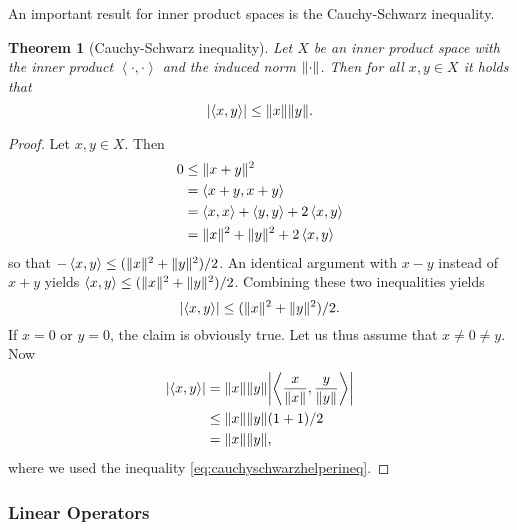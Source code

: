 \documentclass[english, 12pt, a4paper, sci, utf8, a-2b, online]{aaltothesis}
\theoremstyle{definition}
\theoremstyle{plain}
\newtheorem{theorem}{Theorem}[section]
\DeclarePairedDelimiter\abs{\lvert}{\rvert}
\DeclarePairedDelimiter\norm{\lVert}{\rVert}
\newcommand*{\innerprod}[2]{\left\langle #1, #2 \right\rangle}
\numberwithin{equation}{section}
\begin{document}
An important result for inner product spaces is the Cauchy-Schwarz inequality.
\begin{theorem}[Cauchy-Schwarz inequality]
    \label{thm:cauchyschwarz}
    Let $X$ be an inner product space with the inner product
    $\innerprod{\cdot}{\cdot}$ and the induced norm $\norm{\cdot}$.
    Then for all $x,y \in X$ it holds that
    \begin{equation*}
        \abs{\innerprod{x}{y}} \leq \norm{x} \norm{y}.
    \end{equation*}
\end{theorem}
\begin{proof}
    Let $x,y \in X$. Then
    \begin{align*}
        0 
        &\leq \norm{x + y}^2 \\
        &= \innerprod{x + y}{x + y} \\
        &= \innerprod{x}{x} + \innerprod{y}{y} + 2\innerprod{x}{y} \\
        &= \norm{x}^2 + \norm{y}^2 + 2\innerprod{x}{y}
    \end{align*}
    so that $-\innerprod{x}{y} \leq (\norm{x}^2 + \norm{y}^2)/2$.
    An identical argument with $x-y$ instead of $x+y$ yields
    $\innerprod{x}{y} \leq (\norm{x}^2 + \norm{y}^2)/2$.
    Combining these two inequalities yields
    \begin{equation}
        \label{eq:cauchyschwarzhelperineq}
        \abs{\innerprod{x}{y}} \leq (\norm{x}^2 + \norm{y}^2)/2.
    \end{equation}
    If $x=0$ or $y=0$, the claim is obviously true.
    Let us thus assume that $x \neq 0 \neq y$. Now
    \begin{align*}
        \abs{\innerprod{x}{y}}
        &= \norm{x} \norm{y} 
           \abs*{\innerprod{\frac{x}{\norm{x}}}{\frac{y}{\norm{y}}}} \\
        &\leq \norm{x} \norm{y} (1+1)/2 \\
        &= \norm{x} \norm{y},
    \end{align*}
    where we used the inequality \eqref{eq:cauchyschwarzhelperineq}.
\end{proof}

\subsubsection{Linear Operators}
\label{subsubsec:linearoperators}
\end{document}
